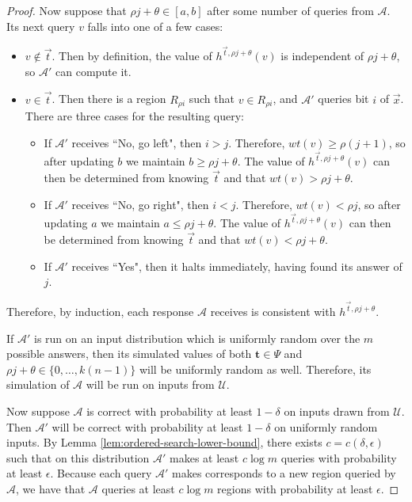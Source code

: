 \documentclass[11pt]{article}
\begin{document}
\begin{proof}
Now suppose that $\rho j + \theta \in [a, b]$ after some number of queries from $\mathcal{A}$. Its next query $v$ falls into one of a few cases:
\begin{itemize}
    \item $v \notin \vec{t}$. Then by definition, the value of $h^{\vec{t}, \rho j + \theta}(v)$ is independent of $\rho j + \theta$, so $\mathcal{A}'$ can compute it.
    \item $v \in \vec{t}$. Then there is a region $R_{\rho i}$ such  that $v \in R_{\rho i}$, and $\mathcal{A}'$ queries bit $i$ of $\vec{x}$. There are three cases for the resulting query:
    \begin{itemize}
    \item If $\mathcal{A}'$ receives ``No, go left", then $i > j$. Therefore, $wt(v) \geq \rho (j+1)$, so after updating $b$ we maintain $b \geq \rho j + \theta$. The value of $h^{\vec{t}, \rho j + \theta}(v)$ can then be determined from knowing $\vec{t}$ and that $wt(v) > \rho j + \theta$.
    \item If $\mathcal{A}'$ receives ``No, go right", then $i < j$. Therefore, $wt(v) < \rho j$, so after updating $a$ we maintain $a \leq \rho j + \theta$. The value of $h^{\vec{t}, \rho j + \theta}(v)$ can then be determined from knowing $\vec{t}$ and that $wt(v) < \rho j + \theta$.
    \item If $\mathcal{A}'$ receives ``Yes", then it halts immediately, having found its answer of $j$.
    \end{itemize}
\end{itemize}

Therefore, by induction, each response $\mathcal{A}$ receives is consistent with $h^{\vec{t}, \rho j + \theta}$.

If $\mathcal{A}'$ is run on an input distribution which is uniformly random over the $m$ possible answers, then its simulated values of both $\mathbf{t} \in \Psi$ and $\rho j + \theta \in \{0, \ldots, k(n-1)\}$ will be uniformly random as well. Therefore, its simulation of $\mathcal{A}$ will be run on inputs from $\mathcal{U}$.

Now suppose $\mathcal{A}$ is correct with probability at least $1-\delta$ on inputs drawn from $\mathcal{U}$. Then $\mathcal{A}'$ will be correct with probability at least $1-\delta$ on uniformly random inputs. By Lemma \ref{lem:ordered-search-lower-bound}, there exists $c = c(\delta, \epsilon)$ such that on this distribution $\mathcal{A}'$ makes at least $c \log m$ queries with probability at least $\epsilon$. Because each query $\mathcal{A}'$ makes corresponds to a new region queried by $\mathcal{A}$, we have that $\mathcal{A}$ queries at least $c \log m$ regions with probability at least $\epsilon$.
\end{proof}
\end{document}
